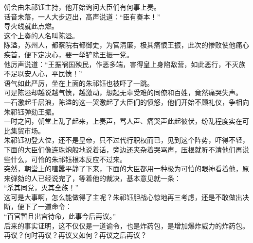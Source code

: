 \begin{multicols}{\theparacolNo}
朝会由朱祁钰主持，他开始询问大臣们有何事上奏。\\

话音未落，一人大步迈出，高声说道：“臣有奏本！”\\

导火线就此点燃。\\

这个上奏的人名叫陈溢。\\

陈溢，苏州人，都察院右都御史，为官清廉，极其痛恨王振，此次的惨败使他痛心疾首，便下定决心，要一举铲除王振一党。\\

他厉声说道：“王振祸国殃民，作恶多端，害得皇上身陷敌营，如此恶行，不灭族不足以安人心，平民愤！”\\

语气如此严厉，坐在上面的朱祁钰也被吓了一跳。\\

可是陈溢却越说越气愤，越激动，想起无辜受难的同僚和百姓，竟然痛哭失声。\\

一石激起千层浪，陈溢的这一哭激起了大臣们的愤怒，他们开始不顾礼仪，争相向朱祁钰弹劾王振。\\

一时之间，朝堂上乱了起来，上奏声，骂人声、痛哭声此起彼伏，纷乱程度实在可比集贸市场。\\

朱祁钰初登大位，还不是皇帝，只不过代行职权而已，见到这个阵势，吓得不轻，下面的大臣们像连珠炮般地说着话，旁边还夹杂着哭骂声，压根就听不清他们再说些什么，可怜的朱祁钰根本反应不过来。\\

突然，朝堂上的喧嚣平静了下来，下面的大臣都用一种极为可怕的眼神看着他，原来弹劾的人已经说完了，等着他的裁决，基本意见就一条：\\

“杀其同党，灭其全族！”\\

这可是大事啊，怎么能做得了主呢？朱祁钰胆战心惊地再三考虑，还是不敢做出决断，便下了一道命令：\\

“百官暂且出宫待命，此事今后再议。”\\

后来的事实证明，这不仅仅是一道谕令，也是炸药包，是增加爆炸威力的炸药包。\\

再议？何时再议？再议又如何？再议之后再议？\\


\end{multicols}
